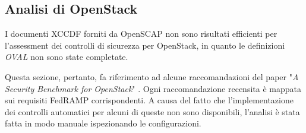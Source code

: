 \documentclass[../main.tex]{subfiles}
\begin{document}
\subsection{Analisi di OpenStack}
I documenti XCCDF forniti da OpenSCAP non sono risultati efficienti per l'assessment dei controlli di sicurezza per OpenStack, in quanto le definizioni \textit{OVAL} non sono state completate.

Questa sezione, pertanto, fa riferimento ad alcune raccomandazioni del paper "\textit{A Security Benchmark for OpenStack}" \cite{MyPaper}. Ogni raccomandazione recensita è mappata sui requisiti FedRAMP corrispondenti. A causa del fatto che l'implementazione dei controlli automatici per alcuni di queste non sono disponibili, l'analisi è stata fatta in modo manuale ispezionando le configurazioni.
\end{document}
